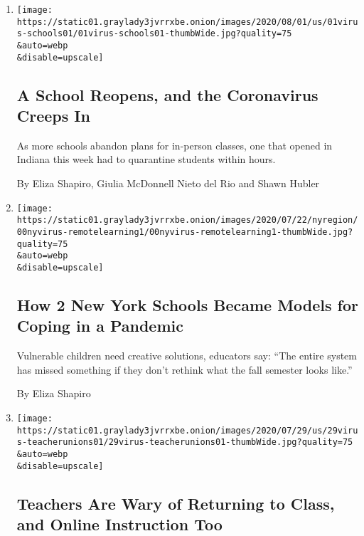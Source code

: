 \begin{enumerate}
\def\labelenumi{\arabic{enumi}.}
\item
  \href{/2020/08/01/us/schools-reopening-indiana-coronavirus.html}{}

  \texttt{[image: https://static01.graylady3jvrrxbe.onion/images/2020/08/01/us/01virus-schools01/01virus-schools01-thumbWide.jpg?quality=75\\\&auto=webp\\\&disable=upscale]}

  \hypertarget{a-school-reopens-and-the-coronavirus-creeps-in}{%
  \subsection{A School Reopens, and the Coronavirus Creeps
  In}\label{a-school-reopens-and-the-coronavirus-creeps-in}}

  As more schools abandon plans for in-person classes, one that opened
  in Indiana this week had to quarantine students within hours.

  By Eliza Shapiro, Giulia McDonnell Nieto del Rio and Shawn Hubler
\item
  \href{/2020/07/31/nyregion/nyc-homeless-children-school.html}{}

  \texttt{[image: https://static01.graylady3jvrrxbe.onion/images/2020/07/22/nyregion/00nyvirus-remotelearning1/00nyvirus-remotelearning1-thumbWide.jpg?quality=75\\\&auto=webp\\\&disable=upscale]}

  \hypertarget{how-2-new-york-schools-became-models-for-coping-in-a-pandemic}{%
  \subsection{How 2 New York Schools Became Models for Coping in a
  Pandemic}\label{how-2-new-york-schools-became-models-for-coping-in-a-pandemic}}

  Vulnerable children need creative solutions, educators say: ``The
  entire system has missed something if they don't rethink what the fall
  semester looks like.''

  By Eliza Shapiro
\item
  \href{/2020/07/29/us/teacher-union-school-reopening-coronavirus.html}{}

  \texttt{[image: https://static01.graylady3jvrrxbe.onion/images/2020/07/29/us/29virus-teacherunions01/29virus-teacherunions01-thumbWide.jpg?quality=75\\\&auto=webp\\\&disable=upscale]}

  \hypertarget{teachers-are-wary-of-returning-to-class-and-online-instruction-too}{%
  \subsection{Teachers Are Wary of Returning to Class, and Online
  Instruction
  Too}\label{teachers-are-wary-of-returning-to-class-and-online-instruction-too}}


\end{enumerate}

